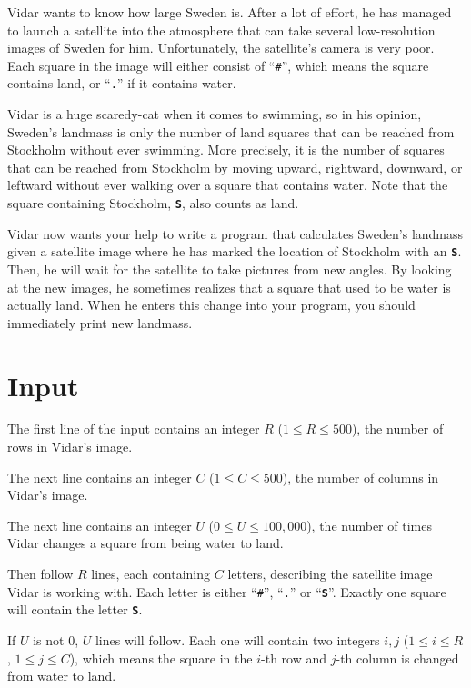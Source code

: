 Vidar wants to know how large Sweden is. After a lot of effort, he has managed to launch a satellite into the atmosphere that can take several low-resolution
images of Sweden for him. Unfortunately, the satellite's camera is very poor. Each square in the image will either consist of ``\texttt{\#}'',
which means the square contains land, or ``\texttt{.}'' if it contains water.

Vidar is a huge scaredy-cat when it comes to swimming, so in his opinion, Sweden's landmass is only the number of land squares that can be
reached from Stockholm without ever swimming. More precisely, it is the number of squares that can be reached from Stockholm by moving upward,
rightward, downward, or leftward without ever walking over a square that contains water. Note that the square containing Stockholm,
\textbf{\texttt{S}}, also counts as land.

Vidar now wants your help to write a program that calculates Sweden's landmass given a satellite image where he has marked the location of
Stockholm with an \textbf{\texttt{S}}. Then, he will wait for the satellite to take pictures from new angles. By looking at the new images,
he sometimes realizes that a square that used to be water is actually land. When he enters this change into your program, you should
immediately print new landmass.

\section*{Input}
The first line of the input contains an integer $R$ ($1 \le R \le 500$), the number of rows in Vidar's image.

The next line contains an integer $C$ ($1 \le C \le 500$), the number of columns in Vidar's image.

The next line contains an integer $U$ ($0 \le U \le 100,000$), the number of times Vidar changes a square from being water to land.

Then follow $R$ lines, each containing $C$ letters, describing the satellite image Vidar is working with. Each letter is either
``\texttt{\#}'', ``\texttt{.}'' or ``\textbf{\texttt{S}}''. Exactly one square will contain the letter \textbf{\texttt{S}}.

If $U$ is not 0, $U$ lines will follow. Each one will contain two integers $i, j$ ($1 \le i \le R$, $1 \le j \le C$),
which means the square in the $i$-th row and $j$-th column is changed from water to land.


